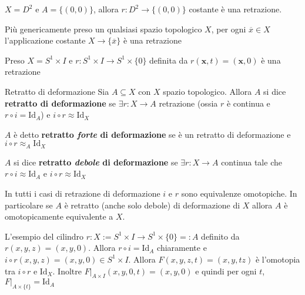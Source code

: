 \begin{example}
    \(X = D^2\) e \(A = \{{(0,0)}\} \), allora \(r : D^2 \to \{{(0,0)}\} \)
    costante è una retrazione.

    Più genericamente preso un qualsiasi spazio topologico \(X\), per ogni
    \(\overline{x} \in X\) l'applicazione costante \(X \to \{\overline{x}\} \) è
    una retrazione
\end{example}

\begin{example}
    Preso \(X = S^{1} \times I\) e \(r : S^{1} \times  I \to S^{1} \times \{0\}
    \) definita da \(r{(\mathbf{x} , t)} = {(\mathbf{x} , 0)}\) è una retrazione
\end{example}

\begin{definition}{Retratto di deformazione}
    Sia \(A \subseteq X \) con \(X\) spazio topologico. Allora \(A\) si dice
    \textbf{retratto di deformazione} se \(\exists r : X \to A\) retrazione
    (ossia \(r\) è continua e \(r \circ i = \mathrm{Id}_A\)) e \(i\circ r
    \approx \mathrm{Id}_X\) 

    \tcbline

    \(A\) è detto \textbf{retratto \emph{forte} di deformazione} se è un
    retratto di deformazione e \(i \circ r \approx_A \mathrm{Id}_X\) 

    \tcbline

    \(A\) si dice \textbf{retratto \emph{debole} di deformazione} se \(\exists r
    : X \to A\) continua tale che \(r \circ i \approx \mathrm{Id}_A\) e \(i
    \circ r \approx \mathrm{Id}_X\) 
\end{definition}
\begin{remark}
    In tutti i casi di retrazione di deformazione \(i\) e \(r\) sono equivalenze
    omotopiche.
    In particolare se \(A\) è retratto (anche solo debole) di deformazione di
    \(X\) allora \(A\) è omotopicamente equivalente a \(X\).
\end{remark}

\begin{example}
    L'esempio del cilindro \(r : X := S^{1} \times I \to S^{1} \times \{0\} =: A \)
    definito da \(r{(x, y, z)} = {(x, y, 0)}\). Allora \(r \circ i =
    \mathrm{Id}_A\) chiaramente e \(i \circ r {(x, y, z)} = {(x,y,0)} \in
    S^{1}\times I\). Allora \(F(x, y, z, t) = {(x, y, tz)}\) è l'omotopia tra
    \(i\circ r\) e \(\mathrm{Id}_X\). Inoltre \(F|_{A \times I}{(x, y, 0, t)} =
    {(x, y, 0)}\) e quindi per ogni \(t\), \(F|_{A \times \{t\} } =
    \mathrm{Id}_A\) 
\end{example}

